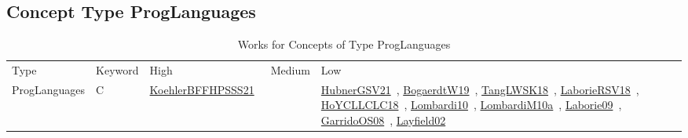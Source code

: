 \clearpage
\subsection{Concept Type ProgLanguages}
\label{sec:ProgLanguages}
{\scriptsize
\begin{longtable}{lp{3cm}>{\raggedright\arraybackslash}p{6cm}>{\raggedright\arraybackslash}p{6cm}>{\raggedright\arraybackslash}p{8cm}}
\rowcolor{white}\caption{Works for Concepts of Type ProgLanguages}\\ \toprule
\rowcolor{white}Type & Keyword & High & Medium & Low\\ \midrule\endhead
\bottomrule
\endfoot
ProgLanguages & C  & \href{works/KoehlerBFFHPSSS21.pdf}{KoehlerBFFHPSSS21}~\cite{KoehlerBFFHPSSS21} &  & \href{works/HubnerGSV21.pdf}{HubnerGSV21}~\cite{HubnerGSV21}, \href{works/BogaerdtW19.pdf}{BogaerdtW19}~\cite{BogaerdtW19}, \href{works/TangLWSK18.pdf}{TangLWSK18}~\cite{TangLWSK18}, \href{works/LaborieRSV18.pdf}{LaborieRSV18}~\cite{LaborieRSV18}, \href{works/HoYCLLCLC18.pdf}{HoYCLLCLC18}~\cite{HoYCLLCLC18}, \href{works/Lombardi10.pdf}{Lombardi10}~\cite{Lombardi10}, \href{works/LombardiM10a.pdf}{LombardiM10a}~\cite{LombardiM10a}, \href{works/Laborie09.pdf}{Laborie09}~\cite{Laborie09}, \href{works/GarridoOS08.pdf}{GarridoOS08}~\cite{GarridoOS08}, \href{works/Layfield02.pdf}{Layfield02}~\cite{Layfield02}\\

\end{longtable}}
